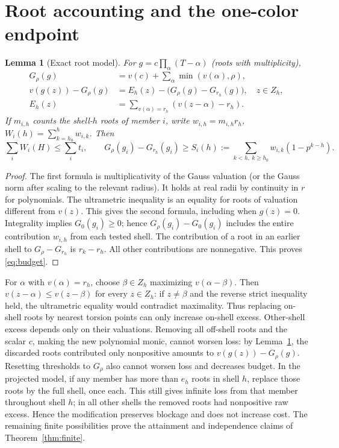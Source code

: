 \documentclass[11pt]{article}
\newtheorem{lemma}[theorem]{Lemma}
\theoremstyle{remark}\newtheorem{remark}[theorem]{Remark}
\begin{document}
\section{Root accounting and the one-color endpoint}\label{sec:root}
\begin{lemma}[Exact root model]\label{lem:model}
For $g=c\prod_{\alpha}(T-\alpha)$ (roots with multiplicity),
\begin{align*}
 G_\rho(g)&=v(c)+\sum_\alpha\min(v(\alpha),\rho),\\
 v(g(z))-G_\rho(g)&=E_h(z)-\bigl(G_\rho(g)-G_{r_h}(g)\bigr),\quad z\in Z_h,\\
 E_h(z)&=\sum_{v(\alpha)=r_h}(v(z-\alpha)-r_h).
\end{align*}
If $m_{i,h}$ counts the shell-$h$ roots of member $i$, write $w_{i,h}=m_{i,h}r_h$, $W_i(h)=\sum_{k=h_0}^h w_{i,k}$. Then
\begin{equation}\label{eq:budget}
 \sum_i W_i(H)\le \sum_i t_i,\qquad
 G_\rho(g_i)-G_{r_h}(g_i)\ge S_i(h):=\sum_{k<h,\ k\ge h_0} w_{i,k}(1-p^{k-h}).
\end{equation}
\end{lemma}
\begin{proof}
The first formula is multiplicativity of the Gauss valuation (or the Gauss norm after scaling to the relevant radius). It holds at real radii by continuity in $r$ for polynomials. The ultrametric inequality is an equality for roots of valuation different from $v(z)$. This gives the second formula, including when $g(z)=0$. Integrality implies $G_0(g_i)\ge0$; hence $G_\rho(g_i)-G_0(g_i)$ includes the entire contribution $w_{i,h}$ from each tested shell. The contribution of a root in an earlier shell to $G_\rho-G_{r_h}$ is $r_k-r_h$. All other contributions are nonnegative. This proves \eqref{eq:budget}.
\end{proof}

For $\alpha$ with $v(\alpha)=r_h$, choose $\beta\in Z_h$ maximizing $v(\alpha-\beta)$. Then $v(z-\alpha)\le v(z-\beta)$ for every $z\in Z_h$: if $z\ne\beta$ and the reverse strict inequality held, the ultrametric equality would contradict maximality. Thus replacing on-shell roots by nearest torsion points can only increase on-shell excess. Other-shell excess depends only on their valuations. Removing all off-shell roots and the scalar $c$, making the new polynomial monic, cannot worsen loss: by Lemma~\ref{lem:model}, the discarded roots contributed only nonpositive amounts to $v(g(z))-G_\rho(g)$. Resetting thresholds to $G_\rho$ also cannot worsen loss and decreases budget. In the projected model, if any member has more than $e_h$ roots in shell $h$, replace those roots by the full shell, once each. This still gives infinite loss from that member throughout shell $h$; in all other shells the removed roots had nonpositive raw excess. Hence the modification preserves blockage and does not increase cost. The remaining finite possibilities prove the attainment and independence claims of Theorem~\ref{thm:finite}.
\end{document}
